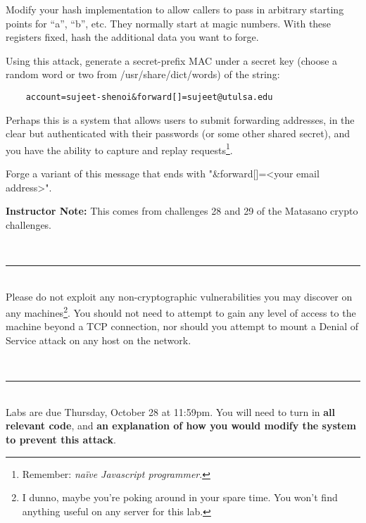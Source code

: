 \documentclass[11pt,oneside]{article}
\newcommand{\sectionfont}{phv} %
\renewcommand{\section}[1] {
    \vspace{12pt}{\quad\fontfamily{\sectionfont}\selectfont\Large\scshape\textbf{#1}}\\[-10pt]
    \vspace{8pt}\rule{\textwidth}{1pt}\\[-16pt]

}
\begin{document}
Modify your hash implementation to allow callers to pass in arbitrary starting
points for ``a'', ``b'', etc. They normally start at magic numbers. With these
registers fixed, hash the additional data you want to forge.

Using this attack, generate a secret-prefix MAC under a secret key (choose a
random word or two from /usr/share/dict/words) of the string:
\begin{lstlisting}
	account=sujeet-shenoi&forward[]=sujeet@utulsa.edu
\end{lstlisting}
Perhaps this is a system that allows users to submit forwarding addresses, in
the clear but authenticated with their passwords (or some other shared secret),
and you have the ability to capture and replay requests\footnote{Remember:
\textit{na\"ive Javascript programmer}.}.

Forge a variant of this message that ends with "\&forward[]=<your email
address>".

\ifinstructornotes
\textbf{Instructor Note:} This comes from challenges 28 and 29 of the Matasano
crypto challenges.
\fi

\section{Rules}

Please do not exploit any non-cryptographic vulnerabilities you may discover on
any machines\footnote{I dunno, maybe you're poking around in your spare time.
You won't find anything useful on any server for this lab.}. You should not need
to attempt to gain any level of access to the machine beyond a TCP connection,
nor should you attempt to mount a Denial of Service attack on any host on the
network.

\section{Grading}
Labs are due Thursday, October 28 at 11:59pm. You will need to turn in
\textbf{all relevant code}, and \textbf{an explanation of how you would modify
the system to prevent this attack}.
\end{document}
